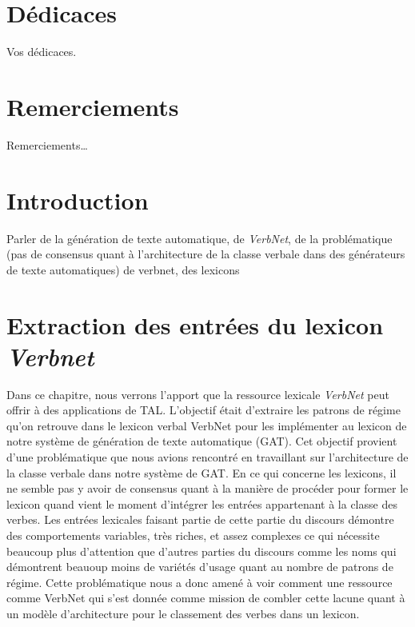 \documentclass[12pt,maitrise,frenchb,natbib,twoside,initial]{dms}
\numberwithin{equation}{section}
\numberwithin{table}{chapter}
\numberwithin{figure}{chapter}
\begin{document}
\chapter*{Dédicaces}

\vspace{2cm}
\hspace{2.5cm}Vos d\'edicaces.

\chapter*{Remerciements}

\noindent Remerciements\dots



\NoChapterPageNumber 


\chapter*{Introduction}


\noindent Parler de la génération de texte automatique, de\emph{ VerbNet}, de la problématique (pas de consensus quant à l'architecture de la classe verbale dans des générateurs de texte automatiques) de verbnet, des lexicons 


\chapter{Extraction des entrées du lexicon \emph{Verbnet}}

Dans ce chapitre, nous verrons l'apport que la ressource lexicale \emph{VerbNet} peut offrir à des applications de TAL. L'objectif était d'extraire les patrons de régime qu'on retrouve dans le lexicon verbal VerbNet pour les implémenter au lexicon  de notre système de génération de texte automatique (GAT). Cet objectif provient d'une problématique que nous avions rencontré en travaillant sur l'architecture de la classe verbale dans notre système de GAT.  En ce qui concerne les lexicons, il ne semble pas y avoir de consensus quant à la manière de procéder pour former le lexicon quand vient le moment d'intégrer les entrées appartenant à la classe des verbes.  Les entrées lexicales faisant partie de cette partie du discours démontre des comportements variables, très riches, et assez complexes ce qui nécessite beaucoup plus d'attention que d'autres parties du discours comme les noms qui démontrent beauoup moins de variétés d'usage quant au nombre de patrons de régime. Cette problématique nous a donc amené à voir comment une ressource comme VerbNet qui s'est donnée comme mission de combler cette lacune quant à un modèle d'architecture pour le classement des verbes dans un lexicon.
\end{document}
